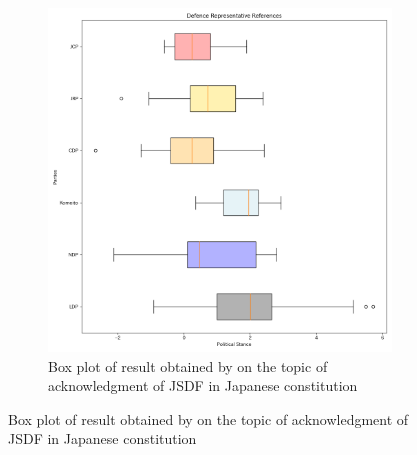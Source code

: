 \documentclass[final,5p,times,twocolumn,authoryear]{elsarticle}
\begin{document}
\begin{figure}
\centering
    \begin{subfigure}{0.3\textwidth}
      \centering
      \includegraphics[width=1\linewidth]{figs/defence_box_plot.png}
      \caption{Box plot of result obtained by \citeauthor{kato2024lupinllmbasedpoliticalideology} on the topic of acknowledgment of JSDF in Japanese constitution}
      \label{fig:sub1}
    \end{subfigure}
    

\end{figure}
\end{document}
